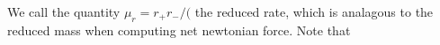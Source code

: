 We call the quantity \(\mu_r = r_+r_-/(\) the reduced rate, which is analagous to the reduced mass when computing net newtonian force.  Note that